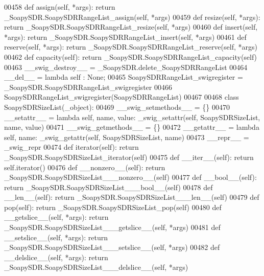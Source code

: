 \begin{DoxyCode}
{{{{00458     \textcolor{keyword}{def }assign(self, *args): \textcolor{keywordflow}{return} \_SoapySDR.SoapySDRRangeList\_assign(self, *args)
00459     \textcolor{keyword}{def }resize(self, *args): \textcolor{keywordflow}{return} \_SoapySDR.SoapySDRRangeList\_resize(self, *args)
00460     \textcolor{keyword}{def }insert(self, *args): \textcolor{keywordflow}{return} \_SoapySDR.SoapySDRRangeList\_insert(self, *args)
00461     \textcolor{keyword}{def }reserve(self, *args): \textcolor{keywordflow}{return} \_SoapySDR.SoapySDRRangeList\_reserve(self, *args)
00462     \textcolor{keyword}{def }capacity(self): \textcolor{keywordflow}{return} \_SoapySDR.SoapySDRRangeList\_capacity(self)
00463     \_\_swig\_destroy\_\_ = \_SoapySDR.delete\_SoapySDRRangeList
00464     \_\_del\_\_ = \textcolor{keyword}{lambda} self : \textcolor{keywordtype}{None};
00465 SoapySDRRangeList\_swigregister = \_SoapySDR.SoapySDRRangeList\_swigregister
00466 SoapySDRRangeList_swigregister(SoapySDRRangeList)
00467 
00468 \textcolor{keyword}{class }SoapySDRSizeList(_object):
00469     \_\_swig\_setmethods\_\_ = \{\}
00470     \_\_setattr\_\_ = \textcolor{keyword}{lambda} self, name, value: _swig_setattr(self, SoapySDRSizeList, name, value)
00471     \_\_swig\_getmethods\_\_ = \{\}
00472     \_\_getattr\_\_ = \textcolor{keyword}{lambda} self, name: _swig_getattr(self, SoapySDRSizeList, name)
00473     \_\_repr\_\_ = \_swig\_repr
00474     \textcolor{keyword}{def }iterator(self): \textcolor{keywordflow}{return} \_SoapySDR.SoapySDRSizeList\_iterator(self)
00475     \textcolor{keyword}{def }__iter__(self): \textcolor{keywordflow}{return} self.iterator()
00476     \textcolor{keyword}{def }__nonzero__(self): \textcolor{keywordflow}{return} \_SoapySDR.SoapySDRSizeList\_\_\_nonzero\_\_(self)
00477     \textcolor{keyword}{def }__bool__(self): \textcolor{keywordflow}{return} \_SoapySDR.SoapySDRSizeList\_\_\_bool\_\_(self)
00478     \textcolor{keyword}{def }__len__(self): \textcolor{keywordflow}{return} \_SoapySDR.SoapySDRSizeList\_\_\_len\_\_(self)
00479     \textcolor{keyword}{def }pop(self): \textcolor{keywordflow}{return} \_SoapySDR.SoapySDRSizeList\_pop(self)
00480     \textcolor{keyword}{def }__getslice__(self, *args): \textcolor{keywordflow}{return} \_SoapySDR.SoapySDRSizeList\_\_\_getslice\_\_(self, *args)
00481     \textcolor{keyword}{def }__setslice__(self, *args): \textcolor{keywordflow}{return} \_SoapySDR.SoapySDRSizeList\_\_\_setslice\_\_(self, *args)
00482     \textcolor{keyword}{def }__delslice__(self, *args): \textcolor{keywordflow}{return} \_SoapySDR.SoapySDRSizeList\_\_\_delslice\_\_(self, *args)
}}}}
\end{DoxyCode}
